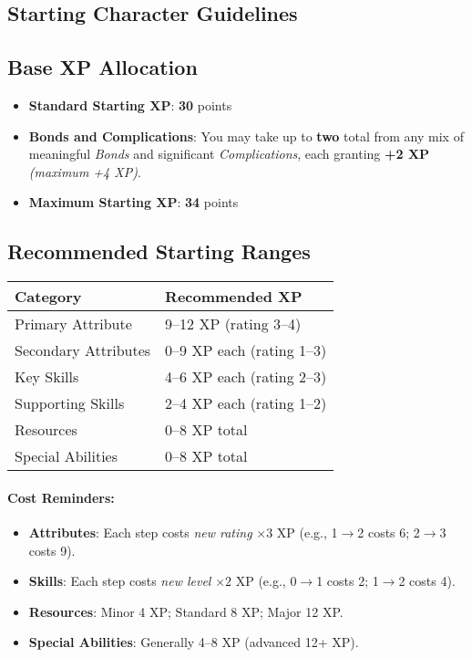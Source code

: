 \begin{multicols}{2}
\section{Starting Character Guidelines}
\label{ch:xp-paths:starting}

\subsection*{Base XP Allocation}
\begin{itemize}
\item \textbf{Standard Starting XP}: \textbf{30} points
\item \textbf{Bonds and Complications}: You may take up to \textbf{two} total from any mix of meaningful \emph{Bonds} and significant \emph{Complications}, each granting \textbf{+2 XP} \emph{(maximum +4 XP)}.
\item \textbf{Maximum Starting XP}: \textbf{34} points
\end{itemize}

\subsection*{Recommended Starting Ranges}
\begin{center}
\small
\begin{tabular}{ll}
\toprule
\textbf{Category} & \textbf{Recommended XP} \\
\midrule
Primary Attribute & 9--12 XP (rating 3--4) \\
Secondary Attributes & 0--9 XP each (rating 1--3) \\
Key Skills & 4--6 XP each (rating 2--3) \\
Supporting Skills & 2--4 XP each (rating 1--2) \\
Resources & 0--8 XP total \\
Special Abilities & 0--8 XP total \\
\bottomrule
\end{tabular}
\end{center}

\paragraph{Cost Reminders:}
\begin{itemize}
\item \textbf{Attributes}: Each step costs \emph{new rating} $\times 3$ XP (e.g., 1$\to$2 costs 6; 2$\to$3 costs 9).
\item \textbf{Skills}: Each step costs \emph{new level} $\times 2$ XP (e.g., 0$\to$1 costs 2; 1$\to$2 costs 4).
\item \textbf{Resources}: Minor 4 XP; Standard 8 XP; Major 12 XP.
\item \textbf{Special Abilities}: Generally 4--8 XP (advanced 12+ XP).
\end{itemize}


\end{multicols}
